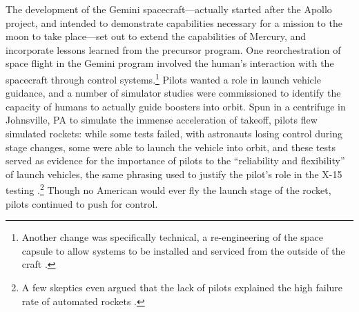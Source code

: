 

The development of the Gemini spacecraft---actually started after the
Apollo project, and intended to demonstrate capabilities necessary for
a mission to the moon to take place---set out to extend the
capabilities of Mercury, and incorporate lessons learned from the
precursor program. One
reorchestration of space flight in the Gemini program involved the
human's interaction with the spacecraft through control
systems.\footnote{Another change was specifically technical, a
re-engineering of the space capsule to allow systems to be installed
and serviced from the outside of the craft \cite{NASAGeminiConcept}.}
Pilots wanted a role in launch vehicle guidance, and a number of
simulator studies were commissioned to identify the capacity of humans to
actually guide boosters into orbit. Spun in a
centrifuge in Johnsville, PA to simulate the immense acceleration of
takeoff, pilots flew
simulated rockets: while some tests failed, with astronauts losing
control during stage changes, some were able to launch the vehicle
into orbit, and these tests served as evidence for the importance of
pilots to the ``reliability and flexibility'' of launch vehicles,
the same phrasing used to justify the pilot's role in the X-15
testing \cite[p. 72]{DM}.\footnote{A few skeptics even argued that the lack of pilots
explained the high failure rate of automated rockets \cite[p. 73]{DM}.}
Though no American would ever fly the launch stage of
the rocket, pilots continued to push for control. 

